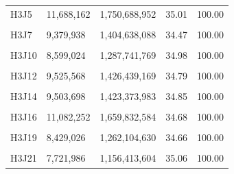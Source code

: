 \documentclass[
  a4paper,
  titlepage]{article}
\begin{document}
\begin{longtable}[t]{lllll}
H3J5 & 11,688,162 & 1,750,688,952 & 35.01 & 100.00\\
 
\cellcolor{gray!6}{H3J6} & \cellcolor{gray!6}{10,244,740} & \cellcolor{gray!6}{1,534,416,755} & \cellcolor{gray!6}{34.61} & \cellcolor{gray!6}{100.00}\\
 
H3J7 & 9,379,938 & 1,404,638,088 & 34.47 & 100.00\\
 
\cellcolor{gray!6}{H3J8} & \cellcolor{gray!6}{8,680,212} & \cellcolor{gray!6}{1,300,238,221} & \cellcolor{gray!6}{34.76} & \cellcolor{gray!6}{100.00}\\
 
H3J10 & 8,599,024 & 1,287,741,769 & 34.98 & 100.00\\
 
\cellcolor{gray!6}{H3J11} & \cellcolor{gray!6}{8,615,504} & \cellcolor{gray!6}{1,290,235,870} & \cellcolor{gray!6}{34.98} & \cellcolor{gray!6}{100.00}\\
 
H3J12 & 9,525,568 & 1,426,439,169 & 34.79 & 100.00\\
 
\cellcolor{gray!6}{H3J13} & \cellcolor{gray!6}{8,852,826} & \cellcolor{gray!6}{1,326,006,951} & \cellcolor{gray!6}{34.65} & \cellcolor{gray!6}{100.00}\\
 
H3J14 & 9,503,698 & 1,423,373,983 & 34.85 & 100.00\\
 
\cellcolor{gray!6}{H3J15} & \cellcolor{gray!6}{8,971,650} & \cellcolor{gray!6}{1,343,601,836} & \cellcolor{gray!6}{34.40} & \cellcolor{gray!6}{100.00}\\
 
H3J16 & 11,082,252 & 1,659,832,584 & 34.68 & 100.00\\
 
\cellcolor{gray!6}{H3J18} & \cellcolor{gray!6}{8,503,574} & \cellcolor{gray!6}{1,273,426,048} & \cellcolor{gray!6}{34.74} & \cellcolor{gray!6}{100.00}\\
 
H3J19 & 8,429,026 & 1,262,104,630 & 34.66 & 100.00\\
 
\cellcolor{gray!6}{H3J20} & \cellcolor{gray!6}{9,607,148} & \cellcolor{gray!6}{1,438,941,535} & \cellcolor{gray!6}{34.28} & \cellcolor{gray!6}{100.00}\\
 
H3J21 & 7,721,986 & 1,156,413,604 & 35.06 & 100.00\\
 

\end{longtable}
\end{document}
